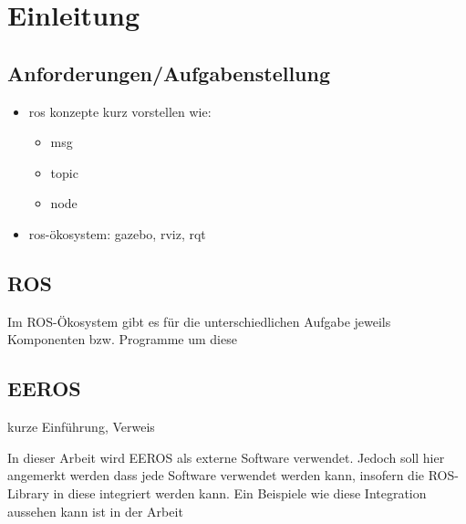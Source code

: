 \chapter{Einleitung}

\section{Anforderungen/Aufgabenstellung}

\begin{itemize}
\item ros konzepte kurz vorstellen wie:
	\begin{itemize}
	\item msg
	\item topic
	\item node
	\end{itemize}
\item ros-ökosystem: gazebo, rviz, rqt
\end{itemize}

\section{ROS}
Im ROS-Ökosystem gibt es für die unterschiedlichen Aufgabe jeweils Komponenten bzw. Programme um diese 


\section{EEROS}
kurze Einführung, Verweis

In dieser Arbeit wird EEROS als externe Software verwendet.
Jedoch soll hier angemerkt werden dass jede Software verwendet werden kann, insofern die ROS-Library in diese integriert werden kann.
Ein Beispiele wie diese Integration aussehen kann ist in der Arbeit %